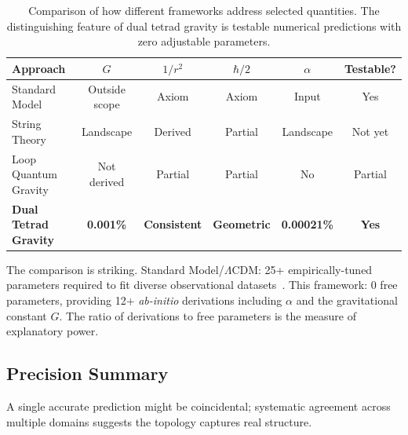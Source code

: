 \documentclass[aps,prd,preprint,superscriptaddress,showpacs,preprintnumbers,amsmath,amssymb,nofootinbib]{revtex4-2}
\begin{document}
\begin{table}[H]
\centering
\small
\begin{tabular*}{\textwidth}{@{\extracolsep{\fill}} lccccc @{}}
\toprule
\textbf{Approach} & \textbf{$G$} & \textbf{$1/r^2$} & \textbf{$\hbar/2$} & \textbf{$\alpha$} & \textbf{Testable?} \\
\midrule
Standard Model & Outside scope & Axiom & Axiom & Input & Yes \\
String Theory & Landscape & Derived & Partial & Landscape & Not yet \\
Loop Quantum Gravity & Not derived & Partial & Partial & No & Partial \\
\textbf{Dual Tetrad Gravity} & \textbf{0.001\%} & \textbf{Consistent} & \textbf{Geometric} & \textbf{0.00021\%} & \textbf{Yes} \\
\bottomrule
\end{tabular*}
\caption{Comparison of how different frameworks address selected quantities. The distinguishing feature of dual tetrad gravity is testable numerical predictions with zero adjustable parameters.}
\label{tab:comparison}
\end{table}

The comparison is striking. Standard Model/$\Lambda$CDM: 25+ empirically-tuned parameters required to fit diverse observational datasets~\cite{pdg2024}. This framework: 0 free parameters, providing 12+ \emph{ab-initio} derivations including $\alpha$ and the gravitational constant $G$. The ratio of derivations to free parameters is the measure of explanatory power.

\subsection{Precision Summary}
\label{subsec:precision}

A single accurate prediction might be coincidental; systematic agreement across multiple domains suggests the topology captures real structure.
\end{document}
